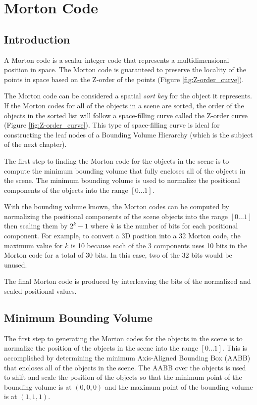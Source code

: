 
\chapter{Morton Code} %
\label{ch:MortonCode}

\section{Introduction}

A Morton code \parencite{30_morton_1966} is a scalar integer code that represents a multidimensional position in space. The Morton code is guaranteed to preserve the locality of the points in space based on the Z-order of the points (Figure \ref{fig:Z-order_curve}).

The Morton code can be considered a spatial \emph{sort key} for the object it represents. If the Morton codes for all of the objects in a scene are sorted, the order of the objects in the sorted list will follow a space-filling curve called the Z-order curve (Figure \ref{fig:Z-order_curve}). This type of space-filling curve is ideal for constructing the leaf nodes of a Bounding Volume Hierarchy (which is the subject of the next chapter).

The first step to finding the Morton code for the objects in the scene is to compute the minimum bounding volume that fully encloses all of the objects in the scene. The minimum bounding volume is used to normalize the positional components of the objects into the range $[0 \ldots 1]$.

With the bounding volume known, the Morton codes can be computed by normalizing the positional components of the scene objects into the range $[0 \ldots 1]$ then scaling them by $2^k-1$ where $k$ is the number of bits for each positional component. For example, to convert a 3D position into a \SI{32}{\bit} Morton code, the maximum value for $k$ is 10 because each of the 3 components uses 10 bits in the Morton code for a total of 30 bits. In this case, two of the 32 bits would be unused.

The final Morton code is produced by interleaving the bits of the normalized and scaled positional values.

\section{Minimum Bounding Volume}

The first step to generating the Morton codes for the objects in the scene is to normalize the position of the objects in the scene into the range $[0 \ldots 1]$. This is accomplished by determining the minimum Axis-Aligned Bounding Box (AABB) that encloses all of the objects in the scene. The AABB over the objects is used to shift and scale the position of the objects so that the minimum point of the bounding volume is at $(0, 0, 0)$ and the maximum point of the bounding volume is at $(1, 1, 1)$.

